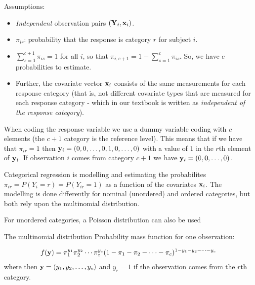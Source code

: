 \documentclass[
  ignorenonframetext,
]{beamer}
\providecommand{\tightlist}{%
  \setlength{\itemsep}{0pt}\setlength{\parskip}{0pt}}
\begin{document}
\begin{frame}
Assumptions:

\begin{itemize}
\tightlist
\item
  \emph{Independent} observation pairs \(({\bf Y}_i,{\bf x}_i)\).
\item
  \(\pi_{ir}\): probability that the response is category \(r\) for
  subject \(i\).
\item
  \(\sum_{s=1}^{c+1}\pi_{is}=1\) for all \(i\), so that
  \(\pi_{i,c+1}=1-\sum_{s=1}^{c}\pi_{is}\). So, we have \(c\)
  probabilities to estimate.
\item
  Further, the covariate vector \({\bf x}_i\) consists of the same
  measurements for each response category (that is, not different
  covariate types that are measured for each response category - which
  in our textbook is written as \emph{independent of the response
  category}).
\end{itemize}
\end{frame}

\begin{frame}
When coding the response variable we use a dummy variable coding with
\(c\) elements (the \(c+1\) category is the reference level). This means
that if we have that \(\pi_{ir}=1\) then
\({\bf y}_i=(0,0,\ldots,0,1,0,\ldots,0)\) with a value of \(1\) in the
\(r\)th element of \({\bf y}_i\). If observation \(i\) comes from
category \(c+1\) we have \({\bf y}_i=(0,0,\ldots,0)\).
\end{frame}

\begin{frame}
\begin{block}{Categorical regression}
\label{categorical-regression}
is modelling and estimating the probabilites
\(\pi_{ir}=P(Y_i=r)=P(Y_{ir}=1)\) as a function of the covariates
\({\bf x}_i\). The modelling is done differently for nominal (unordered)
and ordered categories, but both rely upon the multinomial distribution.

For unordered categories, a Poisson distribution can also be used
\end{block}
\end{frame}

\begin{frame}
\begin{block}{The multinomial distribution}
\label{the-multinomial-distribution}
Probability mass function for one observation:

\[f({\bf y})=\pi_1^{y_{1}} \pi_2^{y_{2}} \cdots \pi_c^{y_c} (1-\pi_1-\pi_2-\cdots-\pi_c)^{1-y_1-y_2-\cdots-y_c}\]
where then \({\bf y}=(y_1,y_2,\ldots,y_c)\) and \(y_r=1\) if the
observation comes from the \(r\)th category.
\end{block}
\end{frame}
\end{document}
